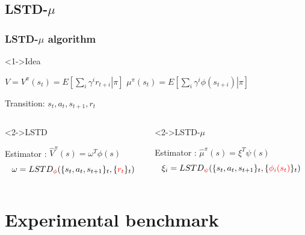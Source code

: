 \documentclass{beamer}
\begin{document}
\subsection{LSTD-$\mu$}
\label{sec-3_2}
\begin{frame}
\frametitle{LSTD-$\mu$ algorithm}
\label{sec-3_2_1}
\begin{block}<1->{Idea}
\label{sec-3_2_1_1}

     $V = V^\pi(s_t) = E\left[\left.\sum\limits_{i}\gamma^i r_{t+i}\right|\pi\right]$
     \hfill $\mu^\pi(s_t) = E\left[\left.\sum\limits_i\gamma^i\phi(s_{t+i})\right|\pi\right]$ \\
     \begin{center}
     Transition: $s_t,a_t,s_{t+1},r_t$
     \end{center}
\end{block}
\begin{columns}
\begin{column}{.45\textwidth}
\begin{block}<2->{LSTD}
\label{sec-3_2_1_2}

     Estimator : $\hat V^\pi(s) = \omega^T\phi(s)$
     \begin{equation*}
     \omega = LSTD_{\color{red}\phi}( \{s_t,a_t,s_{t+1}\}_t,\{{\color{red}r_t}\}_t)
     \end{equation*}
\end{block}
\end{column}
\begin{column}{.5\textwidth}
\begin{block}<2->{LSTD-$\mu$}
\label{sec-3_2_1_3}

     Estimator : $\hat \mu^\pi(s) = \xi^{T}\psi(s)$
     \begin{equation*}
     \xi_i = LSTD_{\color{red}\psi}( \{s_t,a_t,s_{t+1}\}_t, \{{\color{red}\phi_i(s_t)}\}_t )
     \end{equation*}
\end{block}
\end{column}
\end{columns}
\end{frame}
\section{Experimental benchmark}
\label{sec-4}
\end{document}
